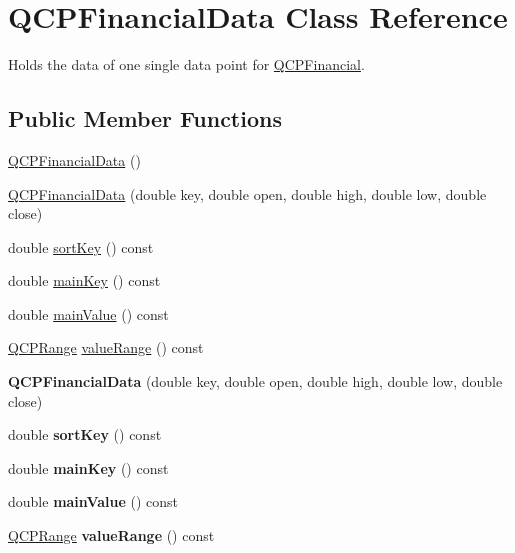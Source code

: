 \hypertarget{class_q_c_p_financial_data}{}\section{Q\+C\+P\+Financial\+Data Class Reference}
\label{class_q_c_p_financial_data}


Holds the data of one single data point for \hyperlink{class_q_c_p_financial}{Q\+C\+P\+Financial}.  


\subsection*{Public Member Functions}
\begin{DoxyCompactItemize}
\item 
\hyperlink{class_q_c_p_financial_data_a1ca53b3a9ae4e9658a4fd1ca57d76ba4}{Q\+C\+P\+Financial\+Data} ()
\item 
\hyperlink{class_q_c_p_financial_data_a069b72c514dfd4fc8e1d5df811e54ca4}{Q\+C\+P\+Financial\+Data} (double key, double open, double high, double low, double close)
\item 
double \hyperlink{class_q_c_p_financial_data_a5e6f6218e3254119355b32d133b03e06}{sort\+Key} () const 
\item 
double \hyperlink{class_q_c_p_financial_data_a91ab5dfe37795a87719f8236c203e5aa}{main\+Key} () const 
\item 
double \hyperlink{class_q_c_p_financial_data_a409cea4fc683803ba70789f7f98ce7f5}{main\+Value} () const 
\item 
\hyperlink{class_q_c_p_range}{Q\+C\+P\+Range} \hyperlink{class_q_c_p_financial_data_a419360904ff00521dd96d53f3d672849}{value\+Range} () const 
\item 
{\bfseries Q\+C\+P\+Financial\+Data} (double key, double open, double high, double low, double close)\hypertarget{class_q_c_p_financial_data_a069b72c514dfd4fc8e1d5df811e54ca4}{}\label{class_q_c_p_financial_data_a069b72c514dfd4fc8e1d5df811e54ca4}

\item 
double {\bfseries sort\+Key} () const \hypertarget{class_q_c_p_financial_data_a5e6f6218e3254119355b32d133b03e06}{}\label{class_q_c_p_financial_data_a5e6f6218e3254119355b32d133b03e06}

\item 
double {\bfseries main\+Key} () const \hypertarget{class_q_c_p_financial_data_a91ab5dfe37795a87719f8236c203e5aa}{}\label{class_q_c_p_financial_data_a91ab5dfe37795a87719f8236c203e5aa}

\item 
double {\bfseries main\+Value} () const \hypertarget{class_q_c_p_financial_data_a409cea4fc683803ba70789f7f98ce7f5}{}\label{class_q_c_p_financial_data_a409cea4fc683803ba70789f7f98ce7f5}

\item 
\hyperlink{class_q_c_p_range}{Q\+C\+P\+Range} {\bfseries value\+Range} () const \hypertarget{class_q_c_p_financial_data_a419360904ff00521dd96d53f3d672849}{}\label{class_q_c_p_financial_data_a419360904ff00521dd96d53f3d672849}

\end{DoxyCompactItemize}
